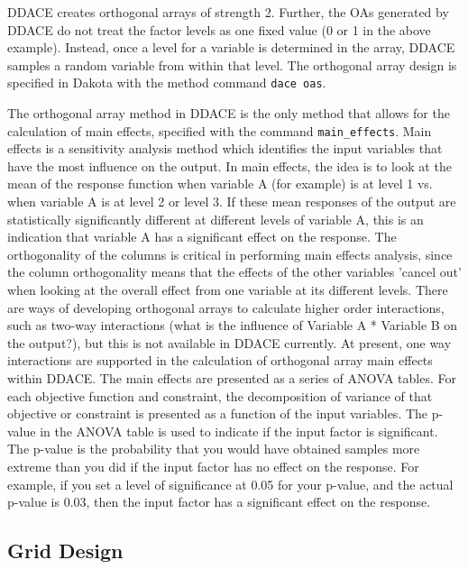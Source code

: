DDACE creates orthogonal arrays of strength 2.  Further, 
the OAs generated by DDACE do not treat the factor levels as one 
fixed value (0 or 1 in the above example).  Instead, once a level 
for a variable is determined in the array,  DDACE 
samples a random variable from within that level.
The orthogonal array design is specified in 
Dakota with the method command \texttt{dace oas}. 

The orthogonal array method in DDACE is the only method that 
allows for the calculation of main effects, specified with the 
command \texttt{main\_effects}.  Main effects is a sensitivity analysis 
method which identifies the input variables that have the most 
influence on the output.  In main effects, the idea is to look 
at the mean of the response function when variable A (for example) 
is at level 1 vs. when variable A is at level 2 or level 3.  
If these mean responses of the output are statistically significantly 
different at different levels of variable A, this is an indication that 
variable A has a significant effect on the response.  
The orthogonality of the columns is critical in performing 
main effects analysis, since the column orthogonality means 
that the effects of the other variables 'cancel out' when 
looking at the overall effect from one variable at its different 
levels.  There are ways of developing orthogonal arrays to calculate 
higher order interactions, such as two-way interactions (what 
is the influence of Variable A * Variable B on the output?), but this is 
not available in DDACE currently.  At present, one way interactions 
are supported in the calculation of orthogonal array main effects within DDACE.
The main effects are presented as a series of ANOVA tables. 
For each objective function and constraint, the decomposition of variance 
of that objective or constraint is presented as a function of the 
input variables.  The p-value in the ANOVA table is used to indicate 
if the input factor is significant.  The p-value is the probability that 
you would have obtained samples more extreme than you did if the input 
factor has no effect on the response.  For example, if you set a level 
of significance at 0.05 for your p-value, and the actual p-value is 0.03, 
then the input factor has a significant effect on the response. 

\subsection{Grid Design}\label{dace:grid}

